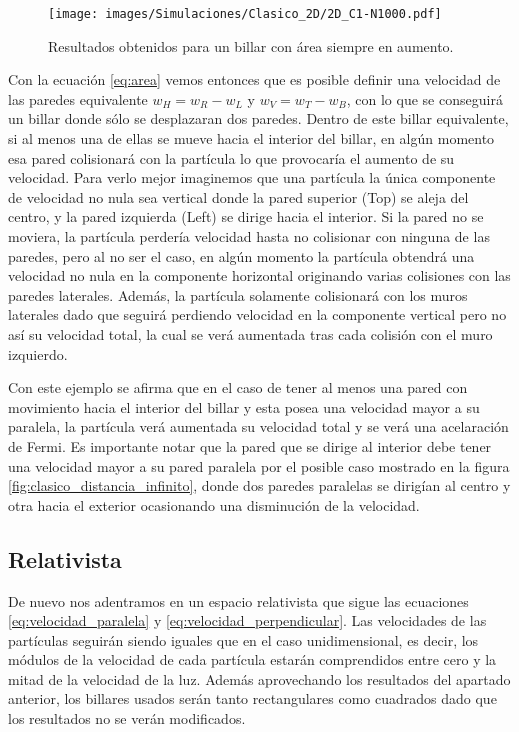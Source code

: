 \begin{figure}[H]
    \centering
    \texttt{[image: images/Simulaciones/Clasico\_2D/2D\_C1-N1000.pdf]}
    \caption{Resultados obtenidos para un billar con área siempre en aumento.}
    \label{fig:2D_C-N1000}
\end{figure}

Con la ecuación \ref{eq:area} vemos entonces que es posible definir una velocidad de las paredes equivalente \( {w_H =  w_R - w_L} \) y \( w_V = w_T - w_B \), con lo que se conseguirá un billar donde sólo se desplazaran dos paredes. Dentro de este billar equivalente, si al menos una de ellas se mueve hacia el interior del billar, en algún momento esa pared colisionará con la partícula lo que provocaría el aumento de su velocidad. Para verlo mejor imaginemos que una partícula la única componente de velocidad no nula sea vertical donde la pared superior (Top) se aleja del centro, y la pared izquierda (Left) se dirige hacia el interior. Si la pared no se moviera, la partícula perdería velocidad hasta no colisionar con ninguna de las paredes, pero al no ser el caso, en algún momento la partícula obtendrá una velocidad no nula en la componente horizontal originando varias colisiones con las paredes laterales. Además, la partícula solamente colisionará con los muros laterales dado que seguirá perdiendo velocidad en la componente vertical pero no así su velocidad total, la cual se verá aumentada tras cada colisión con el muro izquierdo.

\vspace{3mm}

Con este ejemplo se afirma que en el caso de tener al menos una pared con movimiento hacia el interior del billar y esta posea una velocidad mayor a su paralela, la partícula verá aumentada su velocidad total y se verá una acelaración de Fermi. Es importante notar que la pared que se dirige al interior debe tener una velocidad mayor a su pared paralela por el posible caso mostrado en la figura \ref{fig:clasico_distancia_infinito}, donde dos paredes paralelas se dirigían al centro y otra hacia el exterior ocasionando una disminución de la velocidad.

\subsection{Relativista}

De nuevo nos adentramos en un espacio relativista que sigue las ecuaciones \ref{eq:velocidad_paralela} y \ref{eq:velocidad_perpendicular}. Las velocidades de las partículas seguirán siendo iguales que en el caso unidimensional, es decir, los módulos de la velocidad de cada partícula estarán comprendidos entre cero y la mitad de la velocidad de la luz. Además aprovechando los resultados del apartado anterior, los billares usados serán tanto rectangulares como cuadrados dado que los resultados no se verán modificados.

